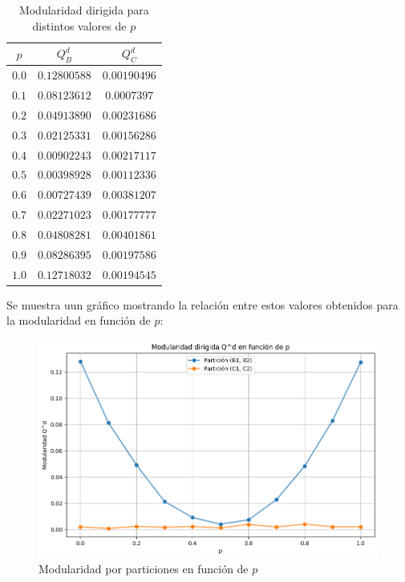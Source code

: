 \documentclass[12pt]{article}
\begin{document}
\begin{enumerate}
    \begin{table}[H]
        \centering
        \begin{tabular}{|c|c|c|}
            \hline
            \textbf{$p$} & \textbf{$Q_{B}^{d}$} & \textbf{$Q_{C}^{d}$} \\ \hline
            $0.0$ & $0.12800588$ & $0.00190496$ \\ \hline
            $0.1$ & $0.08123612$ & $0.0007397$ \\ \hline
            $0.2$ & $0.04913890$ & $0.00231686$ \\ \hline
            $0.3$ & $0.02125331$ & $0.00156286$ \\ \hline  
            $0.4$ & $0.00902243$ & $0.00217117$ \\ \hline
            $0.5$ & $0.00398928$ & $0.00112336$ \\ \hline
            $0.6$ & $0.00727439$ & $0.00381207$ \\ \hline
            $0.7$ & $0.02271023$ & $0.00177777$ \\ \hline
            $0.8$ & $0.04808281$ & $0.00401861$ \\ \hline
            $0.9$ & $0.08286395$ & $0.00197586$ \\ \hline
            $1.0$ & $0.12718032$ & $0.00194545$ \\ \hline
        \end{tabular}
        \caption{Modularidad dirigida para distintos valores de $p$}
        \label{tab:modularidad}
    \end{table}
    
    Se muestra uun gráfico mostrando la relación entre estos valores obtenidos para la modularidad en función de $p$:

    \begin{figure}[H]
        \centering
        \includegraphics[scale=0.5]{images/modularidad_dirigida.png}
        \caption{Modularidad por particiones en función de $p$}
        \label{fig:grafico_modularidad}
    \end{figure}
    

\end{enumerate}
\end{document}
